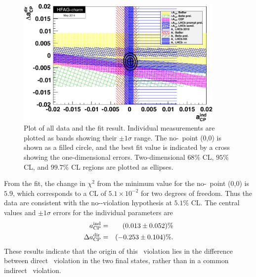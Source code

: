 \begin{figure}
\begin{center}
\includegraphics[width=0.90\textwidth]{figures/charm/deltaACP_AGamma_fit_May14.pdf}
\caption{Plot of all data and the fit result. Individual 
measurements are plotted as bands showing their $\pm1\sigma$ range. 
The no-\cpv\ point (0,0) is shown as a filled circle, and the best 
fit value is indicated by a cross showing the one-dimensional errors. 
Two-dimensional $68\%$ CL, $95\%$ CL, and $99.7\%$ CL regions are 
plotted as ellipses. }
\label{fig:charm:dir_indir_comb}
\end{center}
\end{figure}

From the fit, the change in $\chi^2$ from the minimum value for the no-\cpv\ 
point (0,0) is $5.9$, which corresponds to a CL of $5.1\times 10^{-2}$ for 
two degrees of freedom. Thus the data are consistent with the no-\cp-violation 
hypothesis at $5.1\%$ CL. The central values and $\pm1\sigma$ errors for 
the individual parameters are
\begin{eqnarray}
a_{\rm CP}^{\rm ind} & = & (0.013 \pm 0.052 )\% \nonumber\\
\Delta a_{\rm CP}^{\rm dir} & = & (-0.253 \pm 0.104 )\%.
\end{eqnarray}
These results indicate that the origin of this \cp\ violation lies in the 
difference between direct \cp\ violation in the two final states, rather 
than in a common indirect \cp\ violation.


